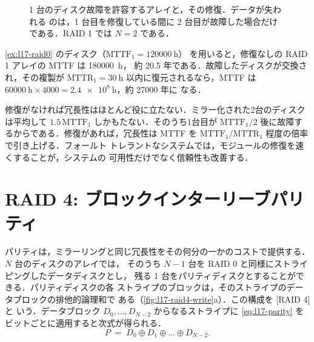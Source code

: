 \documentclass[../main.tex]{subfiles}
\begin{document}
\begin{figure}[htbp]
  \centering
  
  \caption{1 台のディスク故障を許容するアレイと，その修復．データが失われる
    のは，1 台目を修復している間に 2 台目が故障した場合だけである．RAID 1
    では $N=2$ である．}
  \label{fig:l17-raid-repair}
\end{figure}

\begin{example}
  \label{ex:l17-raid1}
  \cref{ex:l17-raid0} のディスク（$\mathrm{MTTF}_1 = \SI{120000}{\hour}$）%
  を用いると，修復なしの RAID 1 アレイの MTTF は \SI{180000}{\hour}，
  約 20.5 年である．故障したディスクが交換され，その複製が
  $\mathrm{MTTR}_1 = \SI{30}{\hour}$ 以内に復元されるなら，MTTF は
  $\SI{60000}{\hour} \times 4000 = \SI{2.4e8}{\hour}$，約 \num{27000} 年に
  なる．
\end{example}

\begin{keypoint}
  修復がなければ冗長性はほとんど役に立たない．ミラー化された2台のディスク
  は平均して $1.5\,\mathrm{MTTF}_1$ しかもたない．そのうち1台目が
  $\mathrm{MTTF}_1/2$ 後に故障するからである．修復があれば，冗長性は MTTF
  を $\mathrm{MTTF}_1/\mathrm{MTTR}_1$ 程度の倍率で引き上げる．フォールト
  トレラントなシステムでは，モジュールの修復を速くすることが，システムの
  可用性だけでなく信頼性も改善する．
\end{keypoint}

\section{RAID 4: ブロックインターリーブパリティ}
\label{sec:l17-raid4}

パリティは，ミラーリングと同じ冗長性をその何分の一かのコストで提供する．
$N$ 台のディスクのアレイでは，
そのうち $N-1$ 台を RAID 0 と同様にストライピングしたデータディスクとし，
残る 1 台をパリティディスクとすることができる．パリティディスクの各
ストライプのブロックは，そのストライプのデータブロックの排他的論理和で
ある（\cref{fig:l17-raid4-write}a）．この構成を [RAID 4] と
いう．データブロック $D_0,\dots,D_{N-2}$ からなるストライプに
\cref{eq:l17-parity} をビットごとに適用すると次式が得られる．
\begin{equation}
  P \;=\; D_0 \oplus D_1 \oplus \dots \oplus D_{N-2} .
  \label{eq:l17-raid4-parity}
\end{equation}
\end{document}
